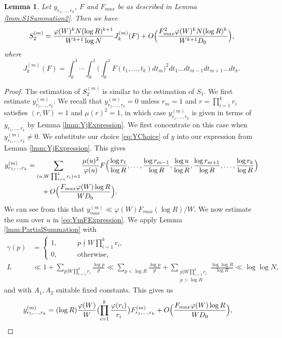 \documentclass[12pt,a4paper]{amsart}
\theoremstyle{plain}
\newtheorem{lmm}[thrm]{Lemma}
\numberwithin{sblmm}{thrm}
\numberwithin{equation}{section}
\renewcommand{\phi}{\varphi}
\begin{document}
\begin{lmm}
Let $y_{r_1,\dotsc,r_k}$, $F$ and $F_{max}$ be as described in Lemma \ref{lmm:S1Summation2}. Then we have
\[S_2^{(m)}=\frac{\phi(W)^k N (\log{R})^{k+1}}{W^{k+1}\log{N}}J^{(m)}_k(F)+O\Bigl(\frac{F_{max}^2\phi(W)^{k}N(\log{R})^k}{W^{k+1} D_0}\Bigr),\]
where
\[J^{(m)}_k(F)=\int_0^1\dotsi\int_0^1\Bigr(\int_0^1F(t_1,\dotsc,t_k)dt_m\Bigr)^2dt_1\dotsc dt_{m-1}dt_{m+1}\dotsc dt_k.\]
\end{lmm}
\begin{proof}
The estimation of $S_2^{(m)}$ is similar to the estimation of $S_1$. We first estimate $y^{(m)}_{r_1,\dotsc,r_k}$. We recall that $y^{(m)}_{r_1,\dotsc,r_k}=0$ unless $r_m=1$ and $r=\prod_{i=1}^kr_i$ satisfies $(r,W)=1$ and $\mu(r)^2=1$, in which case $y^{(m)}_{r_1,\dotsc,r_k}$ is given in terms of $y_{r_1,\dotsc,r_k}$ by Lemma \ref{lmm:YjExpression}. We first concentrate on this case when $y^{(m)}_{r_1,\dotsc,r_k}\ne 0$. We substitute our choice \eqref{eq:YChoice} of $y$ into our expression from Lemma \ref{lmm:YjExpression}. This gives
\begin{align}
y^{(m)}_{r_1,\dotsc,r_k}&=\sum_{(u,W\prod_{i=1}^k r_i)=1}\frac{\mu(u)^2}{\phi(u)}F\Bigl(\frac{\log{r_1}}{\log{R}},\dotsc,\frac{\log{r_{m-1}}}{\log{R}},\frac{\log{u}}{\log{R}},\frac{\log{r_{m+1}}}{\log{R}},\dotsc,\frac{\log{r_{k}}}{\log{R}}\Bigr)\nonumber\\
&\qquad+O\Bigl(\frac{F_{max} \phi(W) \log{R}}{W D_0}\Bigr).\label{eq:YmFExpression}\end{align}
We can see from this that $y^{(m)}_{max}\ll \phi(W)F_{max}(\log{R})/W$. We now estimate the sum over $u$ in \eqref{eq:YmFExpression}. We apply Lemma \ref{lmm:PartialSummation} with
\begin{align}
\gamma(p)&=\begin{cases}1,\qquad &p\nmid W\prod_{i=1}^k r_i,\\
0,&\text{otherwise,}\end{cases}\\
L&\ll 1+\sum_{p|W\prod_{i=1}^k r_i}\frac{\log{p}}{p}\ll \sum_{p<\log{R}}\frac{\log{p}}{p}+\sum_{\substack{p|W\prod_{i=1}^k r_i \\ p>\log{R}}}\frac{\log{\log{R}}}{\log{R}}\ll \log{\log{N}},
\end{align}
and with $A_1,A_2$ suitable fixed constants. This gives us
\begin{align}
y^{(m)}_{r_1,\dotsc,r_k}&=(\log{R})\frac{\phi(W)}{W}\bigl(\prod_{i=1}^k \frac{\phi(r_i)}{r_i}\bigr)F^{(m)}_{r_1,\dotsc,r_{k}}+O\Bigl(\frac{F_{max} \phi(W)\log{R}}{WD_0}\Bigr),\label{eq:YjFExpression}\end{align}

\end{proof}
\end{document}
